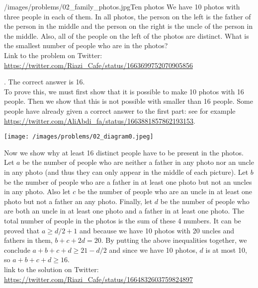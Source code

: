 \begin{problem}{/images/problems/02_family_photos.jpg}{Ten photos}
	We have 10 photos with three people in each of them. In all photos, the person on the left is the father of the person in the middle and the person on the right is the uncle of the person in the middle. Also, all of the people on the left of the photos are distinct. What is the smallest number of people who are in the photos?\\[0.2cm]

	Link to the problem on Twitter:  \url{https://twitter.com/Riazi_Cafe/status/1663699752070905856}
\end{problem}

\begin{solution}.
	The correct answer is 16. \\[0.2cm]
	To prove this, we must first show that it is possible to make 10 photos with 16 people. Then we show that this is not possible with smaller than 16 people. Some people have already given a correct answer to the first part: see for example \url{https://twitter.com/AliAbdi_fa/status/1663881857862193153}.
	\begin{center}
		\texttt{[image: /images/problems/02\_diagram0.jpeg]}
	\end{center}	
	Now we show why at least 16 distinct people have to be present in the photos. Let $a$ be the number of people who are neither a father in any photo nor an uncle in any photo (and thus they can only appear in the middle of each picture). Let $b$ be the number of people who are a father in at least one photo but not an uncles in any photo. Also let $c$ be the number of people who are an uncle in at least one photo but not a father an any photo. Finally, let $d$ be the number of people who are both an uncle in at least one photo and a father in at least one  photo. The total number of people in the photos is the sum of these 4 numbers. It can be proved that $a \geq d/2 + 1$ and because we have 10 photos with 20 uncles and fathers in them, $b + c + 2d = 20$. By putting the above inequalities together, we conclude $a + b + c + d \geq 21 - d/2$ and since we have 10 photos, $d$ is at most 10, so $a + b + c + d \geq 16$.\\[0.2cm]

	link to the solution on Twitter: \url{https://twitter.com/Riazi_Cafe/status/1664832603759824897}

\end{solution}